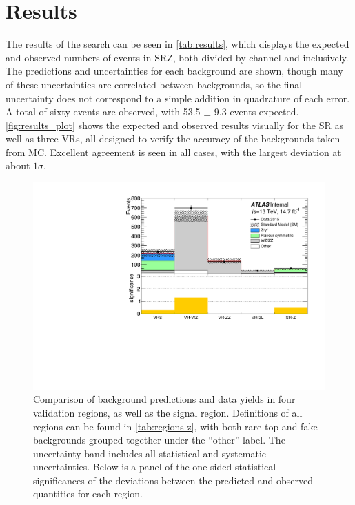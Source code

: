 
\chapter{Results} %

\label{ch:results} 

The results of the search can be seen in \autoref{tab:results}, which displays the expected and observed numbers of events in SRZ, both divided by channel and inclusively. The predictions and uncertainties for each background are shown, though many of these uncertainties are correlated between backgrounds, so the final uncertainty does not correspond to a simple addition in quadrature of each error. A total of sixty events are observed, with 53.5 $\pm$ 9.3 events expected. \autoref{fig:results_plot} shows the expected and observed results visually for the \ac{SR} as well as three \acp{VR}, all designed to verify the accuracy of the backgrounds taken from \ac{MC}. Excellent agreement is seen in all cases, with the largest deviation at about $1\sigma$. 

\begin{centering}
\begin{figure}[!hbt]
\myfloatalign
\includegraphics[width=.9\linewidth]{figures/results/makeSummaryPlot_linear.pdf}
\caption{Comparison of background predictions and data yields in four validation regions, as well as the signal region. Definitions of all regions can be found in \autoref{tab:regions-z}, with both rare top and fake backgrounds grouped together under the ``other'' label. The uncertainty band includes all statistical and systematic uncertainties. Below is a panel of the one-sided statistical significances of the deviations between the predicted and observed quantities for each region.}
\label{fig:results_plot}
\end{figure}
\end{centering}

